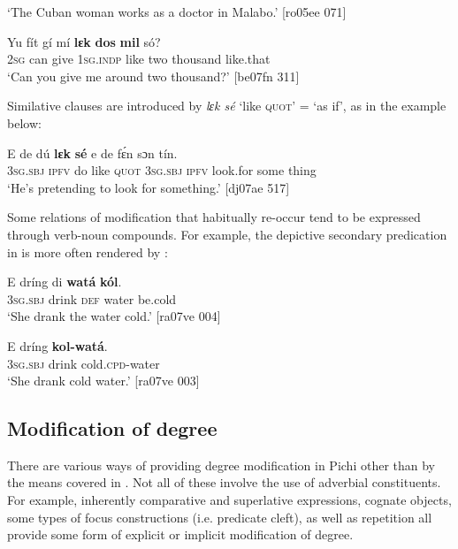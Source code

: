 \glt ‘The Cuban woman works as a doctor in Malabo.’ [ro05ee 071]
\z


\ea%
    \label{ex:key:889}
    \gll Yu  fít  gí  mí    \textbf{lɛk}  \textbf{dos}  \textbf{mil}      só?\\
\textsc{2sg}  can  give  \textsc{1sg.indp}  like  two  thousand  like.that\\

\glt ‘Can you give me around two thousand?’ [be07fn 311]
\z

Similative clauses are introduced by \textit{lɛk sé} ‘like \textsc{quot}’ = ‘as if’, as in the example below:


\ea%
    \label{ex:key:890}
    \gll E    de  dú  \textbf{lɛk}  \textbf{sé}  e    de    fɛ́n    sɔn    tín.\\
\textsc{3sg.sbj}  \textsc{ipfv}  do  like  \textsc{quot}  \textsc{3sg.sbj}  \textsc{ipfv}    look.for  some  thing\\

\glt ‘He’s pretending to look for something.’ [dj07ae 517]
\z

Some relations of modification that habitually re-occur tend to be expressed through verb-noun compounds. For example, the depictive secondary predication in  is more often rendered by :


\ea%
    \label{ex:key:891}
    \gll E    dríng  di  \textbf{watá}  \textbf{kól}.\\
\textsc{3sg.sbj}  drink  \textsc{def}  water  be.cold\\

\glt ‘She drank the water cold.’ [ra07ve 004]
\z


\ea%
    \label{ex:key:892}
    \gll E    dríng  \textbf{kol-watá}.\\
\textsc{3sg.sbj}  drink  cold.\textsc{cpd}{}-water\\

\glt ‘She drank cold water.’ [ra07ve 003]
\z

\subsection{Modification of degree}\label{sec:7.7.3}

There are various ways of providing degree modification in Pichi other than by the means covered in . Not all of these involve the use of adverbial constituents. For example, inherently comparative and superlative expressions, cognate objects, some types of focus constructions (i.e. predicate cleft), as well as repetition all provide some form of explicit or implicit modification of degree.


